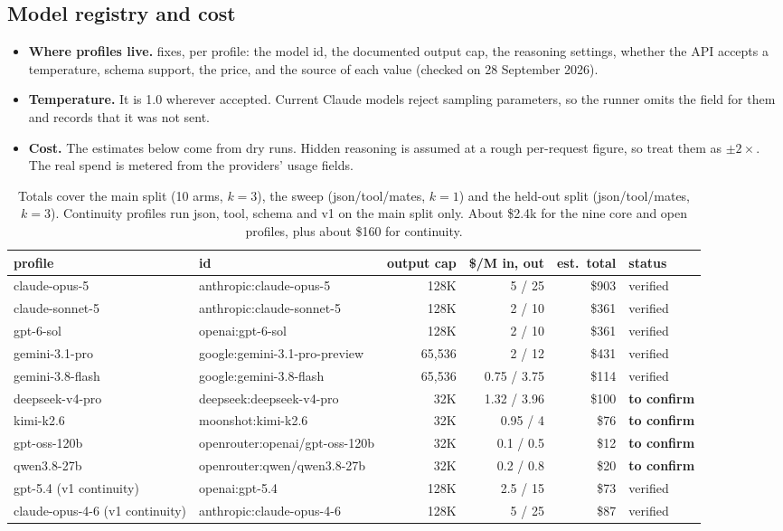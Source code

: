 \documentclass[10pt,a4paper]{article}
\newcommand{\file}[1]{\path{#1}}
\begin{document}
\subsection{Model registry and cost}
\begin{itemize}
\item \textbf{Where profiles live.} \file{v2/config/models.json} fixes, per profile: the model id, the documented output cap, the reasoning settings, whether the API accepts a temperature, schema support, the price, and the source of each value (checked on 28 September 2026).
\item \textbf{Temperature.} It is 1.0 wherever accepted. Current Claude models reject sampling parameters, so the runner omits the field for them and records that it was not sent.
\item \textbf{Cost.} The estimates below come from dry runs. Hidden reasoning is assumed at a rough per-request figure, so treat them as $\pm2\times$. The real spend is metered from the providers' usage fields.
\end{itemize}

\begin{table}[h]\small\centering
\begin{tabular}{@{}llrrrl@{}}
\toprule
profile & id & output cap & \$/M in, out & est.\ total & status \\ \midrule
claude-opus-5 & anthropic:claude-opus-5 & 128K & 5 / 25 & \$903 & verified \\
claude-sonnet-5 & anthropic:claude-sonnet-5 & 128K & 2 / 10 & \$361 & verified \\
gpt-6-sol & openai:gpt-6-sol & 128K & 2 / 10 & \$361 & verified \\
gemini-3.1-pro & google:gemini-3.1-pro-preview & 65{,}536 & 2 / 12 & \$431 & verified \\
gemini-3.8-flash & google:gemini-3.8-flash & 65{,}536 & 0.75 / 3.75 & \$114 & verified \\
deepseek-v4-pro & deepseek:deepseek-v4-pro & 32K & 1.32 / 3.96 & \$100 & \textbf{to confirm} \\
kimi-k2.6 & moonshot:kimi-k2.6 & 32K & 0.95 / 4 & \$76 & \textbf{to confirm} \\
gpt-oss-120b & openrouter:openai/gpt-oss-120b & 32K & 0.1 / 0.5 & \$12 & \textbf{to confirm} \\
qwen3.8-27b & openrouter:qwen/qwen3.8-27b & 32K & 0.2 / 0.8 & \$20 & \textbf{to confirm} \\ \midrule
gpt-5.4 (v1 continuity) & openai:gpt-5.4 & 128K & 2.5 / 15 & \$73 & verified \\
claude-opus-4-6 (v1 continuity) & anthropic:claude-opus-4-6 & 128K & 5 / 25 & \$87 & verified \\
\bottomrule
\end{tabular}
\caption{Totals cover the main split (10 arms, $k=3$), the sweep (json/tool/mates, $k=1$) and the held-out split (json/tool/mates, $k=3$). Continuity profiles run json, tool, schema and v1 on the main split only. About \$2.4k for the nine core and open profiles, plus about \$160 for continuity.}
\end{table}
\end{document}
